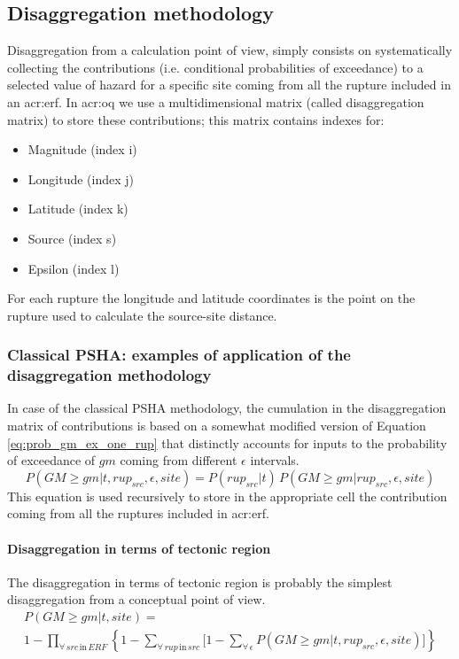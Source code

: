 \subsection{Disaggregation methodology}
Disaggregation from a calculation point of view, simply consists on 
systematically collecting the contributions (i.e. conditional probabilities
of exceedance) to a selected value of hazard for a specific site coming 
from all the rupture included in an \gls{acr:erf}. 
%
In \gls{acr:oq} we use a multidimensional matrix (called disaggregation
matrix) to store these contributions; this matrix contains indexes for:
\begin{itemize}
\item Magnitude (index i)
\item Longitude (index j)
\item Latitude (index k)
\item Source (index s)
\item Epsilon (index l)
\end{itemize}
%
For each rupture the longitude and latitude coordinates is the point 
on the rupture used to calculate the source-site distance.
%
\subsubsection{Classical PSHA: examples of application of the 
disaggregation methodology}
%
In case of the classical PSHA methodology, the cumulation in 
the disaggregation matrix of contributions is based on a 
somewhat modified version of Equation \ref{eq:prob_gm_ex_one_rup}
that distinctly accounts for inputs to the probability of exceedance
of $gm$ coming from different $\epsilon$ intervals.
%
\begin{equation}
P(GM \geq gm|t,rup_{src},\epsilon,site) = 
	P(rup_{src}|t)\,
	P(GM\geq gm|rup_{src},\epsilon,site)
\label{eq:prob_gm_ex_one_rup_eps}
\end{equation}
%
This equation is used recursively to store in the appropriate 
cell the contribution coming from all the ruptures included in 
\gls{acr:erf}. 
%
%
\paragraph{Disaggregation in terms of tectonic region}
The disaggregation in terms of tectonic region is probably the simplest 
disaggregation from a conceptual point of view. 
\begin{multline}
P(GM \geq gm|t,site) = \\
	1-\prod\limits_{\forall\,src\,\text{in}\,ERF}^{}  
	\left\{
		1-\sum\limits_{\forall\,rup\,\text{in}\,src}^{}
		\biggl[ 
			1-\sum\limits_{\forall\,\epsilon}^{} 
			P(GM \geq gm|t,rup_{src},\epsilon,site)
		\biggr]
	\right\}
\label{eq:disaggregation_kernel}
\end{multline}
%

